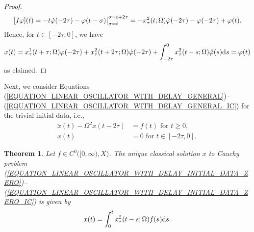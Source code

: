 \documentclass[12pt]{article}
\newtheorem{theorem}{Theorem}[section]
\numberwithin{equation}{section}
\numberwithin{equation}{section}
\begin{document}
\begin{proof}
		\begin{equation}
			\big[I \varphi](t) = -t \dot{\varphi}(-2\tau) - \varphi(t - \sigma)\big|_{\sigma = t}^{\sigma = t + 2\tau}
			= -x^{2}_{\tau}(t; \Omega) \dot{\varphi}(-2\tau) - \varphi(-2\tau) + \varphi(t). \notag
		\end{equation}
		Hence, for $t \in [-2\tau, 0]$, we have
		\begin{equation}
			x(t) = x^{1}_{\tau}(t + \tau; \Omega) \varphi(-2\tau) + x^{2}_{\tau}(t + 2\tau; \Omega) \dot{\varphi}(-2\tau) + \int_{-2\tau}^{0} x^{2}_{\tau}(t - s; \Omega) \ddot{\varphi}(s) \mathrm{d}s =
			\varphi(t) \notag
		\end{equation}
		as claimed.
	\end{proof}

	Next, we consider Equations (\ref{EQUATION_LINEAR_OSCILLATOR_WITH_DELAY_GENERAL})--(\ref{EQUATION_LINEAR_OSCILLATOR_WITH_DELAY_GENERAL_IC}) for the trivial initial data, i.e.,
	\begin{align}
		\ddot{x}(t) - \Omega^{2} x(t - 2\tau) &= f(t) \text{ for } t \geq 0 \label{EQUATION_LINEAR_OSCILLATOR_WITH_DELAY_INITIAL_DATA_ZERO}, \\
		x(t) &= 0 \text{ for } t \in [-2\tau, 0], \label{EQUATION_LINEAR_OSCILLATOR_WITH_DELAY_INITIAL_DATA_ZERO_IC}
	\end{align}

	\begin{theorem}
		\label{THEOREM_SOLUTION_INITIAL_DATA_ZERO}
		Let $f \in C^{0}\big([0, \infty), X\big)$.
		The unique classical solution $x$ to Cauchy problem (\ref{EQUATION_LINEAR_OSCILLATOR_WITH_DELAY_INITIAL_DATA_ZERO})--(\ref{EQUATION_LINEAR_OSCILLATOR_WITH_DELAY_INITIAL_DATA_ZERO_IC}) is given by
		\begin{equation}
			x(t) = \int_{0}^{t} x^{2}_{\tau}(t - s; \Omega) f(s) \mathrm{d}s. \notag
		\end{equation}
	\end{theorem}
\end{document}
